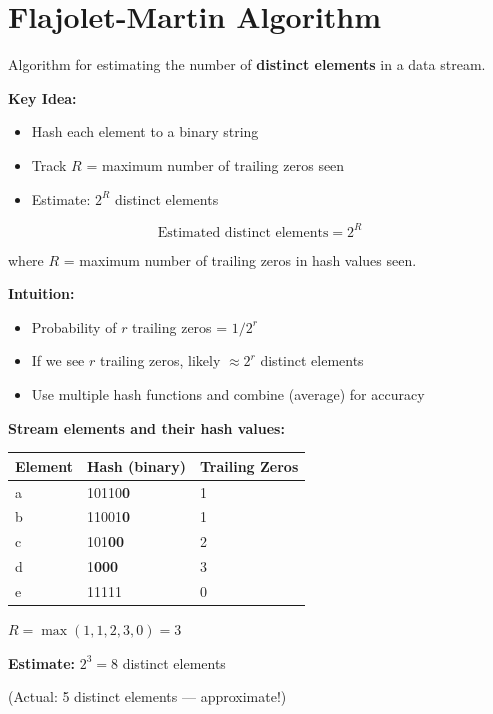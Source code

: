 \section{Flajolet-Martin Algorithm}

\begin{definitionbox}
Algorithm for estimating the number of \textbf{distinct elements} in a data stream.

\textbf{Key Idea:}
\begin{itemize}
    \item Hash each element to a binary string
    \item Track $R$ = maximum number of trailing zeros seen
    \item Estimate: $2^R$ distinct elements
\end{itemize}
\end{definitionbox}

\begin{formulabox}
\[
\text{Estimated distinct elements} = 2^R
\]

where $R$ = maximum number of trailing zeros in hash values seen.

\textbf{Intuition:}
\begin{itemize}
    \item Probability of $r$ trailing zeros = $1/2^r$
    \item If we see $r$ trailing zeros, likely $\approx 2^r$ distinct elements
    \item Use multiple hash functions and combine (average) for accuracy
\end{itemize}
\end{formulabox}

\begin{examplebox}
\textbf{Stream elements and their hash values:}
\begin{center}
\begin{tabular}{lll}
\toprule
\textbf{Element} & \textbf{Hash (binary)} & \textbf{Trailing Zeros} \\
\midrule
a & 10110\textbf{0} & 1 \\
b & 11001\textbf{0} & 1 \\
c & 101\textbf{00} & 2 \\
d & 1\textbf{000} & 3 \\
e & 11111 & 0 \\
\bottomrule
\end{tabular}
\end{center}

$R = \max(1, 1, 2, 3, 0) = 3$

\textbf{Estimate:} $2^3 = 8$ distinct elements

(Actual: 5 distinct elements --- approximate!)
\end{examplebox}

